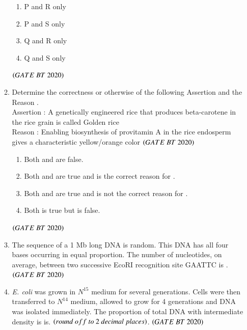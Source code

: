 \documentclass[journal,12pt,onecolumn]{IEEEtran}
\theoremstyle{remark}
\begin{document}
\begin{enumerate}[label=Q\arabic*:]
\begin{enumerate}[label=Q\arabic*:, start=26, leftmargin=2em]
\begin{multicols}{2}
\begin{enumerate}[label=\alph*)]

\item P and R only
\item P and S only
\item Q and R only 
\item Q and S only
\end{enumerate}

\end{multicols}
\hfill$\brak{GATE\ BT\ 2020}$


 \item Determine the correctness or otherwise of the following Assertion  and the Reason
.\\
Assertion : A genetically engineered rice that produces beta-carotene in the rice grain is called Golden rice\\
Reason : Enabling biosynthesis of provitamin A in the rice endosperm gives a characteristic yellow/orange color \hfill$\brak{GATE\ BT\ 2020}$\\

\begin{enumerate}[label=\alph*)]

\item \;Both   and  are false.
\item\;Both  and  are true and  is the correct reason for .
\item\;Both  and  are true and  is not the correct reason for .
\item\;Both  is true but  is  false.
\end{enumerate}

\hfill$\brak{GATE\ BT\ 2020}$


\item The sequence of a 1 Mb long DNA is random. This DNA has all four bases
occurring in equal proportion. The number of nucleotides, on average, between two successive EcoRI recognition site GAATTC is  . \hfill$\brak{GATE\ BT\ 2020}$\\

\item \textit{E. coli} was grown in $N^{15}$ medium for several generations. Cells were then transferred to $N^{14}$ medium, allowed to grow for 4 generations and DNA was isolated immediately. The proportion of total DNA with intermediate density is is.
$\brak{round \ off \ to \ 2 \ decimal\ places}$. \hfill$\brak{GATE\ BT\ 2020}$\\


\end{enumerate}
\end{enumerate}
\end{document}
